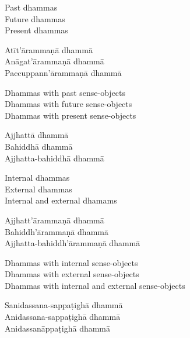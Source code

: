 \begin{english-verses}
  Past dhammas\\
  Future dhammas\\
  Present dhammas
\end{english-verses}

\begin{pali-hang-continued}
  Atīt'ārammaṇā dhammā\\
  Anāgat'ārammaṇā dhammā\\
  Paccuppann'ārammaṇā dhammā
\end{pali-hang-continued}

\begin{english-verses}
  Dhammas with past sense-objects\\
  Dhammas with future sense-objects\\
  Dhammas with present sense-objects
\end{english-verses}

\begin{pali-hang-continued}
  Ajjhattā dhammā\\
  Bahiddhā dhammā\\
  Ajjhatta-bahiddhā dhammā
\end{pali-hang-continued}

\begin{english-verses}
  Internal dhammas\\
  External dhammas\\
  Internal and external dhamams
\end{english-verses}

\begin{pali-hang-continued}
  Ajjhatt'ārammaṇā dhammā\\
  Bahiddh'ārammaṇā dhammā\\
  Ajjhatta-bahiddh'ārammaṇā dhammā
\end{pali-hang-continued}

\begin{english-verses}
  Dhammas with internal sense-objects\\
  Dhammas with external sense-objects\\
  Dhammas with internal and external sense-objects
\end{english-verses}

\begin{pali-hang-continued}
  Sanidassana-sappaṭighā dhammā\\
  Anidassana-sappaṭighā dhammā\\
  Anidassanāppaṭighā dhammā
\end{pali-hang-continued}

